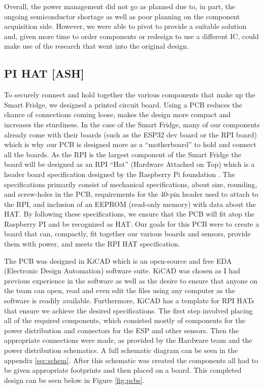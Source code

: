 Overall, the power management did not go as planned due to, in part, the ongoing semiconductor shortage as well as poor planning on the component acquisition side.
However, we were able to pivot to provide a suitable solution and, given more time to order components or redesign to use a different IC, could make use of the research that went into the original design.

\subsection{PI HAT [ASH]}

To securely connect and hold together the various components that make up the Smart Fridge, we designed a printed circuit board.
Using a PCB reduces the chance of connections coming loose, makes the design more compact and increases the sturdiness.
In the case of the Smart Fridge, many of our components already come with their boards (such as the ESP32 dev board or the RPI board) which is why our PCB is designed more as a “motherboard” to hold and connect all the boards.
As the RPI is the largest component of the Smart Fridge the board will be designed as an RPI “Hat” (Hardware Attached on Top) which is a header board specification designed by the Raspberry Pi foundation \cite{}.
The specifications primarily consist of mechanical specifications, about size, rounding, and screw-holes in the PCB, requirements for the 40-pin header used to attach to the RPI, and inclusion of an EEPROM (read-only memory) with data about the HAT.
By following these specifications, we ensure that the PCB will fit atop the Raspberry PI and be recognized as HAT.
Our goals for this PCB were to create a board that can, compactly, fit together our various boards and sensors, provide them with power, and meets the RPI HAT specification.

The PCB was designed in KiCAD which is an open-source and free EDA (Electronic Design Automation) software suite.
KiCAD was chosen as I had previous experience in the software as well as the desire to ensure that anyone on the team can open, read and even edit the files using any computer as the software is readily available.
Furthermore, KiCAD has a template for RPI HATs that ensure we achieve the desired specifications.
The first step involved placing all of the required components, which consisted mostly of components for the power distribution and connectors for the ESP and other sensors.
Then the appropriate connections were made, as provided by the Hardware team and the power distribution schematics.
A full schematic diagram can be seen in the appendix \ref{sec:schem}.
After this schematic was created the components all had to be given appropriate footprints and then placed on a board.
This completed design can be seen below in Figure \ref{fig:pcbs}.

